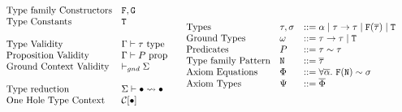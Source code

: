 \documentclass[format=acmsmall,manuscript,review,screen,nonacm,margin=1in,11pt]{acmart}
\begin{document}
\begin{figure}[ht]
    \footnotesize
  \[
    \begin{array}{l l l}
      &\text{Type family Constructors} & \FamCtrs,\MoreFamCtrs\\
      &\text{Type Constants} &\texttt{\TypeCtrs}\\      
      \\
      &\text{Type Validity}               &\ValidType \TEnv \tau\\
      &\text{Proposition Validity}        &\ValidProp \TEnv \Preds\\
      &\text{Ground Context Validity}     &\ValidGCtx{\GEnv}\\
      \\
      &\text{Type reduction}              &\tystepsto\GEnv\bullet\bullet
      \\
      &\text{One Hole Type Context}    &\TEvalCtxt{\bullet}
    \end{array}
    \begin{array}{l l l l l}
      &\text{Types}           &\tau,\sigma  &\bnfeq \alpha \bnfor \tau\to\tau %
                                              \bnfor \FamCtrs(\many\tau) \bnfor \TypeCtrs\\%
      &\text{Ground Types}    &\GTy         &\bnfeq \tau\to\tau \bnfor \TypeCtrs\\
      &\text{Predicates}      &\Preds       &\bnfeq \tau\teq\tau\\
      &\text{Type family Pattern}     &\texttt{\FamPattern} &\bnfeq \many\tau\\
      &\text{Axiom Equations} &\AxiomEq     &\bnfeq \Forall{\many\alpha}{\FamCtrs(\FamPattern) \teq \sigma}\\
      &\text{Axiom Types}     &\AxiomTy     &\bnfeq \many\AxiomEq\\

\end{array}\]
\end{figure}
\end{document}
